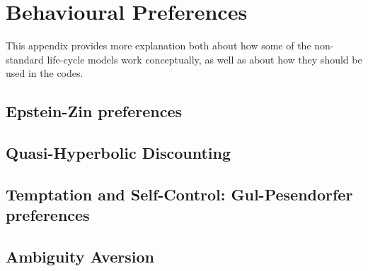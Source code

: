 \documentclass[11pt]{article}%
\begin{document}
\appendix

\newpage



\newpage
\section{Behavioural Preferences}
This appendix provides more explanation both about how some of the non-standard life-cycle models work conceptually, as well as about how they should be used in the codes.

\subsection{Epstein-Zin preferences}


\newpage
\subsection{Quasi-Hyperbolic Discounting}


\newpage
\subsection{Temptation and Self-Control: Gul-Pesendorfer preferences}


\newpage
\subsection{Ambiguity Aversion}


\newpage

\end{document}
